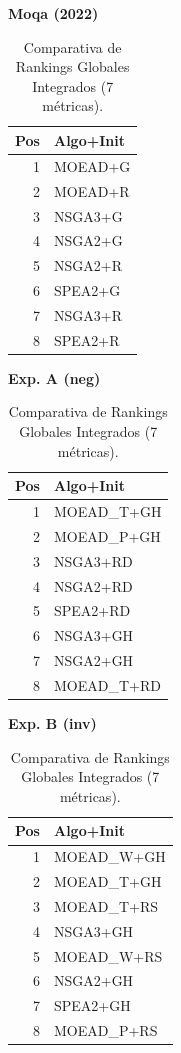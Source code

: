 \documentclass[a4paper,10pt]{article}
\begin{document}
\begin{table}[H]
    \centering
    \begin{minipage}[t]{0.32\textwidth}
        \centering\scriptsize\textbf{Moqa (2022)}\\
        \begin{tabular}{rl}
            \toprule
            Pos & Algo+Init \\ \midrule
            1 & MOEAD+G \\
            2 & MOEAD+R \\
            3 & NSGA3+G \\
            4 & NSGA2+G \\
            5 & NSGA2+R \\
            6 & SPEA2+G \\
            7 & NSGA3+R \\
            8 & SPEA2+R \\
            \bottomrule
        \end{tabular}
    \end{minipage}
    \hfill
    \begin{minipage}[t]{0.32\textwidth}
        \centering\scriptsize\textbf{Exp. A (neg)}\\
        \begin{tabular}{rl}
            \toprule
            Pos & Algo+Init \\ \midrule
            1 & MOEAD\_T+GH \\
            2 & MOEAD\_P+GH \\
            3 & NSGA3+RD \\
            4 & NSGA2+RD \\
            5 & SPEA2+RD \\
            6 & NSGA3+GH \\
            7 & NSGA2+GH \\
            8 & MOEAD\_T+RD \\
            \bottomrule
        \end{tabular}
    \end{minipage}
    \hfill
    \begin{minipage}[t]{0.32\textwidth}
        \centering\scriptsize\textbf{Exp. B (inv)}\\
        \begin{tabular}{rl}
            \toprule
            Pos & Algo+Init \\ \midrule
            1 & MOEAD\_W+GH \\
            2 & MOEAD\_T+GH \\
            3 & MOEAD\_T+RS \\
            4 & NSGA3+GH \\
            5 & MOEAD\_W+RS \\
            6 & NSGA2+GH \\
            7 & SPEA2+GH \\
            8 & MOEAD\_P+RS \\
            \bottomrule
        \end{tabular}
    \end{minipage}
    \caption{Comparativa de Rankings Globales Integrados (7 métricas).}
\end{table}
\end{document}
